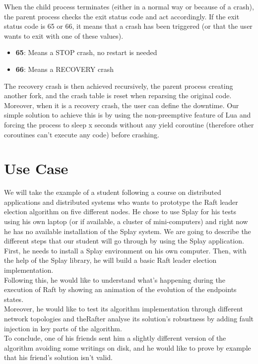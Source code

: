 \documentclass{eplmastersthesis}
\begin{document}
        When the child process terminates (either in a normal way or because
        of a crash), the parent process checks the exit status code and act
        accordingly. If the exit status code is 65 or 66, it means that a
        crash has been triggered (or that the user wants to exit
        with one of these values).

        \begin{itemize}
          \item \textbf{65}: Means a STOP crash, no restart is needed
          \item \textbf{66}: Means a RECOVERY crash
        \end{itemize}

        The recovery crash is then achieved recursively, the parent process
        creating another fork, and the crash table is reset when reparsing
        the original code. Moreover, when it is a recovery crash, the user
        can define the downtime. Our simple solution to achieve this is by
        using the non-preemptive feature of Lua and forcing the process
        to sleep x seconds without any yield coroutine (therefore other
        coroutines can't execute any code) before crashing.

  \chapter{Use Case}

    We will take the example of a student following a course on distributed
    applications and distributed systems who wants to prototype the Raft
    leader election algorithm on five different nodes. He chose to use
    Splay for his tests using his own laptop (or if available, a cluster
    of mini-computers) and right now he has no available installation of the
    Splay system. We are going to describe the different steps that our
    student will go through by using the Splay application.\\

    First, he needs to install a Splay environment on his own computer. Then,
    with the help of the Splay library, he will build a basic Raft leader
    election implementation.\\
    Following this, he would like to understand what's happening during the
    execution of Raft by showing an animation of the evolution of the
    endpoints states.\\
    Moreover, he would like to test its algorithm implementation through
    different network topologies and theRafter analyse its solution's
    robustness by adding fault injection in key parts of the algorithm.\\
    To conclude, one of his friends sent him a slightly different version
    of the algorithm avoiding some writings on disk, and he would like to
    prove by example that his friend's solution isn't valid.
\end{document}
